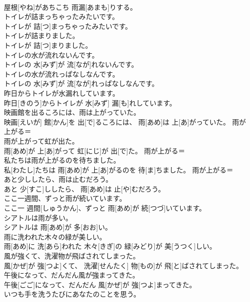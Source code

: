 \documentclass[8pt]{extreport}
\begin{document}
\begin{CJK}{UTF8}{min}
\\	屋根[やね]があちこち 雨漏[あまも]りする。	
\\	トイレが詰まっちゃったみたいです。	
\\	トイレが 詰[つ]まっちゃったみたいです。	
\\	トイレが詰まりました。	
\\	トイレが 詰[つ]まりました。	
\\	トイレの水が流れないんです。	
\\	トイレの 水[みず]が 流[なが]れないんです。	
\\	トイレの水が流れっぱなしなんです。	
\\	トイレの 水[みず]が 流[なが]れっぱなしなんです。	
\\	昨日からトイレが水漏れしています。	
\\	昨日[きのう]からトイレが 水[みず] 漏[も]れしています。	
\\	映画館を出るころには、雨は上がっていた。	
\\	映画[えいが] 館[かん]を 出[で]るころには、 雨[あめ]は 上[あ]がっていた。	雨が上がる＝ 
\\	雨が上がって虹が出た。	
\\	雨[あめ]が 上[あ]がって 虹[にじ]が 出[で]た。	雨が上がる＝ 
\\	私たちは雨が上がるのを待ちました。	
\\	私[わたし]たちは 雨[あめ]が 上[あ]がるのを 待[ま]ちました。	雨が上がる＝ 
\\	あと少ししたら、雨は止むだろう。	
\\	あと 少[すこ]ししたら、 雨[あめ]は 止[や]むだろう。	
\\	ここ一週間、ずっと雨が続いています。	
\\	ここ一 週間[しゅうかん]、ずっと 雨[あめ]が 続[つづ]いています。	
\\	シアトルは雨が多い。	
\\	シアトルは 雨[あめ]が 多[おお]い。	
\\	雨に洗われた木々の緑が美しい。	
\\	雨[あめ]に 洗[あら]われた 木々[きぎ]の 緑[みどり]が 美[うつく]しい。	
\\	風が強くて、洗濯物が飛ばされてしまった。	
\\	風[かぜ]が 強[つよ]くて、 洗濯[せんたく] 物[もの]が 飛[と]ばされてしまった。	
\\	午後になって、だんだん風が強まってきた。	
\\	午後[ごご]になって、だんだん 風[かぜ]が 強[つよ]まってきた。	
\\	いつも手を洗うたびにあなたのことを思う。	

\end{CJK}
\end{document}
